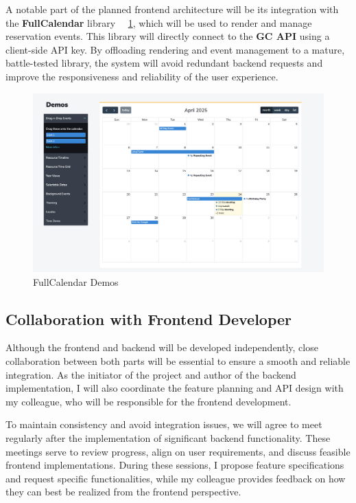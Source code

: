 A notable part of the planned frontend architecture will be its integration with the \textbf{FullCalendar} library~\cite{FullCalendar} ~\ref{fig:fullcalendar}, which will be used to render and manage reservation events. This library will directly connect to the \textbf{GC API} using a client-side API key. By offloading rendering and event management to a mature, battle-tested library, the system will avoid redundant backend requests and improve the responsiveness and reliability of the user experience.

\begin{figure}[!htbp]
  \centering
  \includegraphics[width=\linewidth]{images/fullcalendar}
  \caption{FullCalendar Demos~\cite{FullCalendar}}
  \label{fig:fullcalendar}
\end{figure}

\subsection{Collaboration with Frontend Developer}

Although the frontend and backend will be developed independently, close collaboration between both parts will be essential to ensure a smooth and reliable integration. As the initiator of the project and author of the backend implementation, I will also coordinate the feature planning and API design with my colleague, who will be responsible for the frontend development.

\newpage
To maintain consistency and avoid integration issues, we will agree to meet regularly after the implementation of significant backend functionality. These meetings serve to review progress, align on user requirements, and discuss feasible frontend implementations. During these sessions, I propose feature specifications and request specific functionalities, while my colleague provides feedback on how they can best be realized from the frontend perspective.

